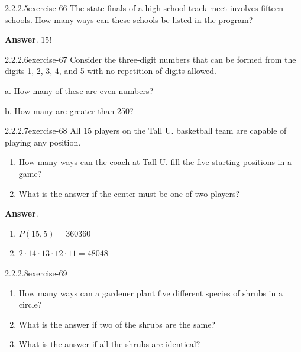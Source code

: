 \documentclass[twoside,10pt,]{book}
\numberwithin{equation}{section}
\begin{document}
\begin{divisionsolution}{2.2.2.5}{}{exercise-66}%
\hypertarget{p-675}{}%
The state finals of a high school track meet involves fifteen schools. How many ways can these schools be listed in the program?%
\par\smallskip%
\noindent\textbf{Answer}.\quad%
\hypertarget{p-676}{}%
\(15!\)%
\end{divisionsolution}%
\begin{divisionsolution}{2.2.2.6}{}{exercise-67}%
\hypertarget{p-677}{}%
Consider the three-digit numbers that can be formed from the digits 1, 2, 3, 4, and 5 with no repetition of digits allowed.%
\par
\hypertarget{p-678}{}%
a. How many of these are even numbers?%
\par
\hypertarget{p-679}{}%
b. How many are greater than 250?%
\end{divisionsolution}%
\begin{divisionsolution}{2.2.2.7}{}{exercise-68}%
\hypertarget{p-680}{}%
All 15 players on the Tall U. basketball team are capable of playing any position.\leavevmode%
\begin{enumerate}[label=(\alph*)]
\item\hypertarget{li-426}{}\hypertarget{p-681}{}%
How many ways can the coach at Tall U. fill the five starting positions in a game?%
\item\hypertarget{li-427}{}\hypertarget{p-682}{}%
What is the answer if the center must be one of two players?%
\end{enumerate}
%
\par\smallskip%
\noindent\textbf{Answer}.\quad%
\hypertarget{p-683}{}%
\leavevmode%
\begin{enumerate}[label=(\alph*)]
\item\hypertarget{li-428}{}\(P(15,5)=360360\)%
\item\hypertarget{li-429}{}\(2\cdot 14\cdot 13\cdot 12\cdot 11=48048\)%
\end{enumerate}
%
\end{divisionsolution}%
\begin{divisionsolution}{2.2.2.8}{}{exercise-69}%
\hypertarget{p-684}{}%
\leavevmode%
\begin{enumerate}[label=(\alph*)]
\item\hypertarget{li-430}{}\hypertarget{p-685}{}%
How many ways can a gardener plant five different species of shrubs in a circle?%
\item\hypertarget{li-431}{}\hypertarget{p-686}{}%
What is the answer if two of the shrubs are the same?%
\item\hypertarget{li-432}{}\hypertarget{p-687}{}%
What is the answer if all the shrubs are identical?%
\end{enumerate}
%
\end{divisionsolution}%
\end{document}
